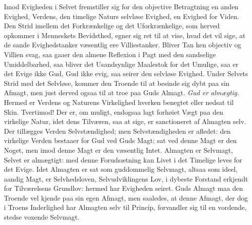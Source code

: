 \documentclass[12pt]{book}
\begin{document}
Imod Evigheden i Selvet fremstiller sig for den objective
Betragtning en anden Evighed, Verdens, den timelige Naturs selvløse
Evighed, en Evighed for Viden. Den Strid imellem det Forkrænkelige
og det Uforkrænkelige, som herved opkommer i Menneskets Bevidsthed,
egner sig ret til at vise, hvad det vil sige, at de sande
Evighedstanker væsentlig ere Villiestanker. Bliver Tan\-
ken objectiv og Villien svag, saa gaaer den almene Reflexion i Pagt
med den sandselige Umiddelbarhed, saa bliver det Usandsynlige
Maalestok for det Umulige, saa er det Evige ikke Gud, Gud ikke evig,
saa seirer den selvløse Evighed. Under Selvets Strid med det
Selvløse, kommer den Troende til at besinde sig dybt paa sin Afmagt,
men just derved ogsaa til at troe paa Guds Almagt. \emph{Gud er
almægtig.} Hermed er Verdens og Naturens Virkelighed hverken
benegtet eller nedsat til Skin. Tvertimod! Der er, om muligt,
endogsaa lagt forhøiet Vægt paa den virkelige Natur, idet dens
Tilværen, saa at sige, er sanctioneret af Almagten selv. Der
tillægges Verden Selvstændighed; men Selvstændigheden er afledet:
den virkelige Verden bestaaer for Gud ved Guds Magt; sat ved denne
Magt er den Noget, men imod denne Magt er den væsentlig Intet.
Almagten er Selvmagt, Selvet er almægtigt: med denne Forudsætning
kan Livet i det Timelige leves for det Evige. Idet Almagten er sat
som guddommelig Selvmagt, altsaa som ideel, aandig Magt, er
Selvhedsloven, Selvudviklingens Lov, i dybeste Forstand erkjendt for
Tilværelsens Grundlov: hermed har Evigheden seiret. Guds Almagt maa
den Troende vel kjende paa sin egen Afmagt, men saaledes, at denne
Afmagt, der dog i Troens Inderlighed har Almagten selv til Princip,
forvandler sig til en vordende, stedse voxende Selvmagt.
\end{document}
